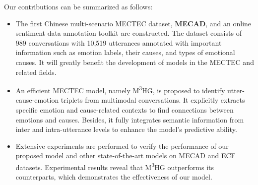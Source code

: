 \documentclass[11pt]{article}
\begin{document}
Our contributions can be summarized as follows:
\begin{itemize}[itemsep=0pt,parsep=0pt,topsep=0pt,partopsep=0pt]
  \item The first Chinese multi-scenario MECTEC dataset, \textbf{MECAD}, and an online sentiment data annotation toolkit are constructed.
  The dataset consists of 989 conversations with 10,519 utterances annotated with important information such as emotion labels, their causes, and types of emotional causes.
  It will greatly benefit the development of models in the MECTEC and related fields.
  \item An efficient MECTEC model, namely M\textsuperscript{3}HG, is proposed to identify utter-cause-emotion triplets from multimodal conversations.
  It explicitly extracts specific emotion and cause-related contexts to find connections between emotions and causes.
  Besides, it fully integrates semantic information from inter and intra-utterance levels to enhance the model's predictive ability. 
  \item Extensive experiments are performed to verify the performance of our proposed model and other state-of-the-art models on MECAD and ECF datasets.
  Experimental results reveal that M\textsuperscript{3}HG outperforms its counterparts, which demonstrates the effectiveness of our model.
\end{itemize}
\end{document}
